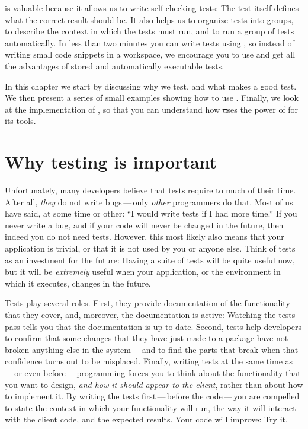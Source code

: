 \documentclass[a4paper,10pt,twoside]{book}
\begin{document}
\sunit is valuable because it allows us to write self-checking tests:
The test itself defines what the correct result should be.
It also helps us to organize tests into groups, to describe the context in which the tests must run, and to run a group of tests automatically.
In less than two minutes you can write tests using \sunit, so instead of writing small code snippets in a workspace, we encourage you to use \sunit and get all the advantages of stored and automatically executable tests.

In this chapter we start by discussing why we test, and what makes a good test.
We then present a series of small examples showing how to use \sunit.
Finally, we look at the implementation of \sunit, so that you can understand how
\st uses the power of  for its tools. 

\section{Why testing is important}
\label{sec:why}

Unfortunately, many developers believe that tests require to much of their time.  
After all, \emph{they} do not write bugs\,---\,only \emph{other} programmers do that.
Most of us have said, at some time or other:
``I would write tests if I had more time.''
If you never write a bug, and if your code will never be changed in the future, then indeed you do not need tests.
However, this most likely also means that your application is trivial, or that it is not used by you or anyone else.  
Think of tests as an investment for the future:
Having a suite of tests will be quite useful now, but it will be \emph{extremely} useful when your application, or the environment in which it executes, changes in the future.

Tests play several roles.
First, they provide documentation of the functionality that they cover, and, moreover, the documentation is active:
Watching the tests pass tells you that the documentation is up-to-date.
Second, tests help developers to confirm that some changes that they have just made to a package have not broken anything else in the system\,---\,and to find the parts that break when that confidence turns out to be misplaced.
Finally, writing tests at the same time as\,---\,or even before\,---\,programming forces you to think about the functionality that you want to design, \emph{and how it should appear to the client}, rather than about how to implement it.
By writing the tests first\,---\,before the code\,---\,you are compelled to state
the context in which your functionality will run, the way it will interact with the client code, and the expected results.  
Your code will improve:
Try it.
\end{document}
